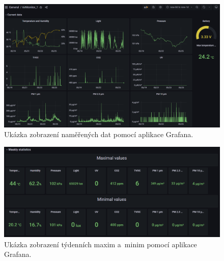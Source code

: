 \begin{figure}[h]
    \centering
    \includegraphics[width=\textwidth]{obrazky/grafana_dark.png}
    \caption{Ukázka zobrazení naměřených dat pomocí aplikace Grafana.}
    \label{fig_GrafanaCurrentData}
\end{figure}

\begin{figure}[h]
    \centering
    \includegraphics[width=\textwidth]{obrazky/grafana_weeklyStatisticsDark.png}
    \caption{Ukázka zobrazení týdenních maxim a~minim pomocí aplikace Grafana.}
    \label{fig_Grafana}
\end{figure}